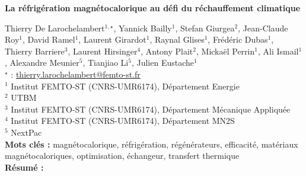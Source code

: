 


    \newpage


%
\begin{flushleft}
\addtocounter{section}{1}
{\Large \textbf{La réfrigération magnétocalorique au défi du réchauffement climatique}}\label{ref:73}
\end{flushleft}
%
Thierry De Larochelambert$^{1,\star}$, Yannick Bailly$^{1}$, Stefan Giurgea$^{2}$, Jean-Claude Roy$^{1}$, David Ramel$^{1}$, Laurent Girardot$^{1}$, Raynal Glises$^{1}$, Frédéric Dubas$^{1}$, Thierry Barriere$^{3}$, Laurent Hirsinger$^{4}$, Antony Plait$^{2}$, Mickaël Perrin$^{1}$, Ali Ismail$^{1}$, Alexandre Meunier$^{5}$, Tianjiao Li$^{5}$, Julien Eustache$^{1}$\\[2mm]
$^{\star}$ \Letter : \url{thierry.larochelambert@femto-st.fr}\\[2mm]
{\footnotesize $^{1}$ Institut FEMTO-ST (CNRS-UMR6174), Département Energie}\\
{\footnotesize $^{2}$ UTBM}\\
{\footnotesize $^{3}$ Institut FEMTO-ST (CNRS-UMR6174), Département Mécanique Appliquée}\\
{\footnotesize $^{4}$ Institut FEMTO-ST (CNRS-UMR6174), Département MN2S}\\
{\footnotesize $^{5}$ NextPac}\\
[4mm]
%
\noindent \textbf{Mots clés : } magnétocalorique, réfrigération, régénérateurs, efficacité, matériaux magnétocaloriques, optimisation, échangeur, transfert thermique\\[4mm]
%
\noindent \textbf{Résumé : } 

